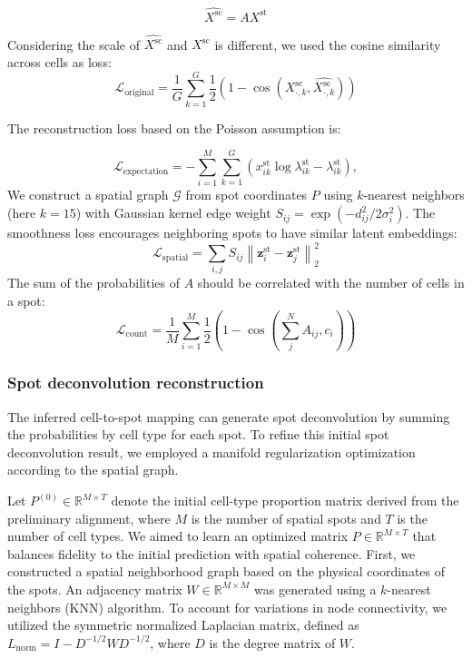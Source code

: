 \documentclass[10pt,a4paper]{article}
\begin{document}
$$\widehat{X^{\mathrm{sc}}} = A X^{\mathrm{st}}$$

Considering the scale of $\widehat{X^{\mathrm{sc}}}$ and $X^{\mathrm{sc}}$ is different, we used the cosine similarity across cells as loss:
\begin{equation}
\mathcal{L}_{\mathrm{original}} = \frac{1}{G} \sum_{k=1}^{G} \frac{1}{2} \left( 1 - \cos\left( X_{\cdot,k}^{\mathrm{sc}}, \widehat{X_{\cdot,k}^{\mathrm{sc}}} \right) \right)
\end{equation}

The reconstruction loss based on the Poisson assumption is:

\begin{equation}
\mathcal{L}_{\mathrm{expectation}} = - \sum_{i=1}^{M} \sum_{k=1}^{G} \left( x_{ik}^{\mathrm{st}} \log \lambda_{ik}^{\mathrm{st}} - \lambda_{ik}^{\mathrm{st}} \right),
\end{equation}
We construct a spatial graph $\mathcal{G}$ from spot coordinates $P$ using $k$-nearest neighbors (here $k = 15$) with Gaussian kernel edge weight $S_{ij} = \exp\left( - d_{ij}^{2} / 2\sigma_{i}^{2} \right)$. The smoothness loss encourages neighboring spots to have similar latent embeddings:
\begin{equation}
\mathcal{L}_{\mathrm{spatial}} = \sum_{i,j} S_{ij} \left\| \mathbf{z}_{i}^{\mathrm{st}} - \mathbf{z}_{j}^{\mathrm{st}} \right\|_{2}^{2}
\end{equation}
The sum of the probabilities of $A$ should be correlated with the number of cells in a spot:
\begin{equation}
\mathcal{L}_{\mathrm{count}} = \frac{1}{M} \sum_{i=1}^{M} \frac{1}{2} \left( 1 -\cos\left( \sum_{j}^{N} A_{ij}, c_{i}\right) \right)
\end{equation}

\subsubsection{Spot deconvolution reconstruction}

The inferred cell-to-spot mapping can generate spot deconvolution by summing the probabilities by cell type for each spot. To refine this initial spot deconvolution result, we employed a manifold regularization optimization according to the spatial graph.

Let $P^{(0)} \in \mathbb{R}^{M \times T}$ denote the initial cell-type proportion matrix derived from the preliminary alignment, where $M$ is the number of spatial spots and $T$ is the number of cell types. We aimed to learn an optimized matrix $P \in \mathbb{R}^{M \times T}$ that balances fidelity to the initial prediction with spatial coherence. First, we constructed a spatial neighborhood graph based on the physical coordinates of the spots. An adjacency matrix $W \in \mathbb{R}^{M \times M}$ was generated using a $k$-nearest neighbors (KNN) algorithm. To account for variations in node connectivity, we utilized the symmetric normalized Laplacian matrix, defined as $L_{\mathrm{norm}} = I - D^{-1/2} W D^{-1/2}$, where $D$ is the degree matrix of $W$.
\end{document}
